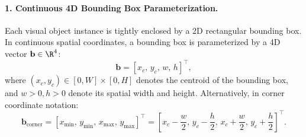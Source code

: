 \paragraph{1. Continuous 4D Bounding Box Parameterization.}
Each visual object instance is tightly enclosed by a 2D rectangular bounding box. In continuous spatial coordinates, a bounding box is parameterized by a 4D vector $\mathbf{b} \in \R^4$:
\begin{equation}
\mathbf{b} = [x_c, \, y_c, \, w, \, h]^\top,
\label{eq:bounding_box_center_param}
\end{equation}
where $(x_c, y_c) \in [0, W] \times [0, H]$ denotes the centroid of the bounding box, and $w > 0, h > 0$ denote its spatial width and height. Alternatively, in corner coordinate notation:
\begin{equation}
\mathbf{b}_{\text{corner}} = [x_{\min}, \, y_{\min}, \, x_{\max}, \, y_{\max}]^\top = \left[x_c - \frac{w}{2}, \, y_c - \frac{h}{2}, \, x_c + \frac{w}{2}, \, y_c + \frac{h}{2}\right]^\top.
\label{eq:bounding_box_corner_param}
\end{equation}

